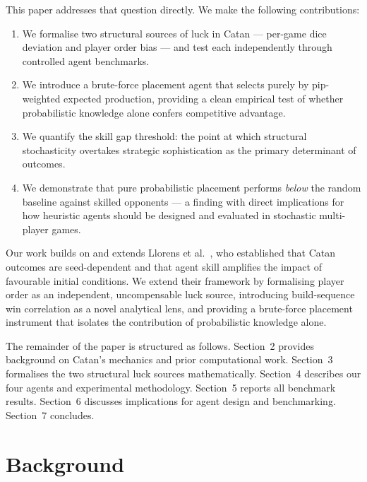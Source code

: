 \documentclass[12pt,a4paper]{article}
\begin{document}
This paper addresses that question directly. We make the following
contributions:

\begin{enumerate}[label=(\roman*)]
  \item We formalise two structural sources of luck in Catan ---
  per-game dice deviation and player order bias --- and test each
  independently through controlled agent benchmarks.

  \item We introduce a brute-force placement agent that selects purely
  by pip-weighted expected production, providing a clean empirical test
  of whether probabilistic knowledge alone confers competitive advantage.

  \item We quantify the skill gap threshold: the point at which
  structural stochasticity overtakes strategic sophistication as the
  primary determinant of outcomes.

  \item We demonstrate that pure probabilistic placement performs
  \textit{below} the random baseline against skilled opponents ---
  a finding with direct implications for how heuristic agents should
  be designed and evaluated in stochastic multi-player games.
\end{enumerate}

Our work builds on and extends Llorens et al.~\cite{llorens2025seeding},
who established that Catan outcomes are seed-dependent and that agent
skill amplifies the impact of favourable initial conditions. We extend
their framework by formalising player order as an independent,
uncompensable luck source, introducing build-sequence win correlation as
a novel analytical lens, and providing a brute-force placement instrument
that isolates the contribution of probabilistic knowledge alone.

The remainder of the paper is structured as follows. Section~2 provides
background on Catan's mechanics and prior computational work. Section~3
formalises the two structural luck sources mathematically. Section~4
describes our four agents and experimental methodology. Section~5 reports
all benchmark results. Section~6 discusses implications for agent design
and benchmarking. Section~7 concludes.

\section{Background}
\end{document}
